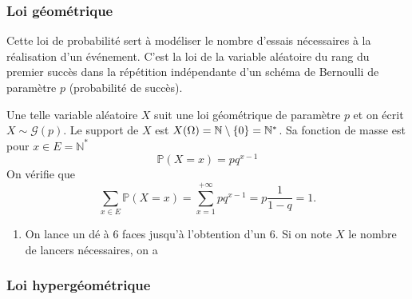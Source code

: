 \subsubsection{Loi géométrique}

Cette loi de probabilité sert à modéliser le nombre d'essais nécessaires à la réalisation d'un événement. C'est la loi de la variable aléatoire du rang du premier succès dans la répétition indépendante d'un schéma de Bernoulli de paramètre $p$ (probabilité de succès). 

Une telle variable aléatoire $X$ suit une loi géométrique de paramètre $p$ et on écrit $X \sim \mathcal{G}(p)$. Le support de $X$ est $X(\Omega)= \mathbb{N}\setminus\left\{ 0 \right\} = \mathbb{N}^*$. Sa fonction de masse est pour $x \in  E =\mathbb{N}^*$  
	\[ 
		\mathbb{P}(X=x) = p q^{x-1}
	\]
On vérifie que 
\[ \sum_{x \in E} \mathbb{P}(X=x) =  \sum_{x=1}^{+ \infty} p q^{x-1} = p \frac{1}{1-q}  =1.\]
\begin{center}
	
\end{center}
\sld{\vfill\pagebreak[5]}%
\begin{exemple}
	\begin{enumerate}
		\item On lance un dé à 6 faces jusqu'à l'obtention d'un 6. Si on note $X$ le nombre de lancers nécessaires, on  a \pl{\rep{2cm}}
	\end{enumerate}
\end{exemple}
\sld{\vfill\pagebreak[5]}%
\subsubsection{Loi hypergéométrique}


